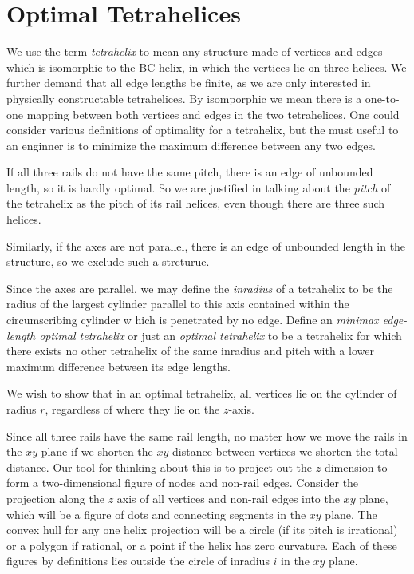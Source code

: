 \documentclass[11pt]{article}
\begin{document}
\section{Optimal Tetrahelices}

We use the term \emph{tetrahelix} to mean any structure made of
vertices and edges which is isomorphic to the BC helix, in which the
vertices lie on three helices. We further demand that all edge lengths
be finite, as we are only interested in physically constructable tetrahelices.
By isomporphic we mean there is a one-to-one mapping between both
vertices and edges in the two tetrahelices.
One could consider various definitions of optimality for a
tetrahelix, but the must useful to an enginner is to minimize the
maximum difference between any two edges.

If all three rails do not have the same pitch, there is an edge of
unbounded length, so it is hardly optimal. So we are justified in talking about the
\emph{pitch} of 
the tetrahelix as the pitch of its rail helices, even though there are
three such helices.

Similarly, if the axes are not parallel, there is an edge of
unbounded length in the structure, so we exclude such a strcturue.

Since the axes are parallel, we may define the \emph{inradius} of a
tetrahelix to be the radius of the largest
cylinder parallel to this axis contained within the circumscribing cylinder w
hich is penetrated by no edge.
Define an \emph{minimax edge-length optimal tetrahelix} or just an
\emph{optimal tetrahelix} to be a tetrahelix for which there exists
no other tetrahelix of the same inradius and pitch with a lower maximum
difference between its edge lengths. 

We wish to show that in an optimal tetrahelix, all vertices lie on the cylinder
of radius $r$, regardless of where they lie on the $z$-axis.

Since all three rails have the same rail length, no matter how we
move the rails in the $xy$ plane if we shorten the $xy$ distance between
vertices we shorten the total distance.
Our tool for thinking about this is to project out the $z$ dimension to form
a two-dimensional figure of nodes and non-rail edges.
Consider the projection along the $z$ axis of all vertices and non-rail edges into the $xy$ plane, which will be
a figure of dots and connecting segments in the $xy$ plane. The convex
hull for any one helix projection will be a circle (if its pitch is
irrational) or a polygon if rational, or a point if the helix has
zero curvature. Each of these figures by definitions lies outside the
circle of inradius $i$ in the $xy$ plane.
\end{document}

